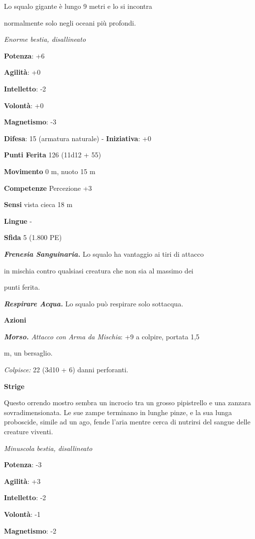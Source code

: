 \begin{multicols}{2}
Lo squalo gigante è lungo 9 metri e lo si incontra

normalmente solo negli oceani più profondi.

\emph{Enorme bestia, disallineato}

\textbf{Potenza}: +6

\textbf{Agilità}: +0

\textbf{Intelletto}: -2

\textbf{Volontà}: +0

\textbf{Magnetismo}: -3

\textbf{Difesa}: 15 (armatura naturale) - \textbf{Iniziativa}: +0

\textbf{Punti Ferita} 126 (11d12 + 55)

\textbf{Movimento} 0 m, nuoto 15 m

\textbf{Competenze} Percezione +3

\textbf{Sensi} vista cieca 18 m

\textbf{Lingue} -

\textbf{Sfida} 5 (1.800 PE)

\emph{\textbf{Frenesia Sanguinaria.}} Lo squalo ha vantaggio ai tiri di
attacco

in mischia contro qualsiasi creatura che non sia al massimo dei

punti ferita.

\emph{\textbf{Respirare Acqua.}} Lo squalo può respirare solo sottacqua.

\textbf{Azioni}

\emph{\textbf{Morso.} Attacco con Arma da Mischia}: +9 a colpire,
portata 1,5

m, un bersaglio.

\emph{Colpisce:} 22 (3d10 + 6) danni perforanti.



\textbf{Strige}

Questo orrendo mostro sembra un incrocio tra un grosso pipistrello e una
zanzara sovradimensionata. Le sue zampe terminano in lunghe pinze, e la
sua lunga proboscide, simile ad un ago, fende l'aria mentre cerca di
nutrirsi del sangue delle creature viventi.

\emph{Minuscola bestia, disallineato}

\textbf{Potenza}: -3

\textbf{Agilità}: +3

\textbf{Intelletto}: -2

\textbf{Volontà}: -1

\textbf{Magnetismo}: -2


\end{multicols}
